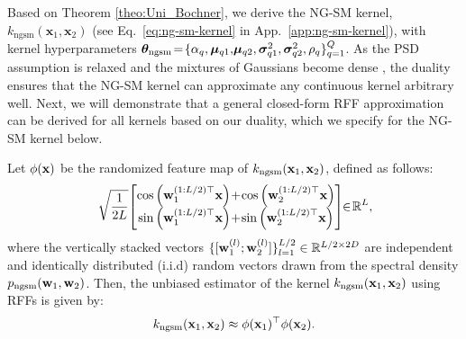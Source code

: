 {\color{black}Based on Theorem \ref{theo:Uni_Bochner}, we derive the NG-SM kernel, \(k_{\text{ngsm}}(\mathbf{x}_1, \mathbf{x}_2)\) (see Eq.~\eqref{eq:ng-sm-kernel} in App.~\ref{app:ng-sm-kernel}), with kernel hyperparameters  $\boldsymbol{\theta}_{\mathrm{ngsm}} \!=\! \{\alpha_q, \boldsymbol{\mu}_{q1},\!{\color{black}\boldsymbol{\mu}_{q2}}, \boldsymbol{\sigma}_{q1}^2, \boldsymbol{\sigma}_{q2}^2, \rho_q\}_{q=1}^Q$.} As the PSD assumption is relaxed and the mixtures of Gaussians become dense \citep{plataniotis2017gaussian}, the duality ensures that the NG-SM kernel can approximate any continuous kernel arbitrary well. Next, we will demonstrate that a general closed-form RFF approximation can be derived for all kernels based on our duality, which we specify for the NG-SM kernel below. 

\begin{theorem}
\label{theo:Non_stationary RFF}
Let $\phi({\mathbf x})$ be the randomized feature map of $k_{\text{ngsm}}({\mathbf x}_1, {\mathbf x}_2)$, defined as follows:
\begin{equation}
    \!\sqrt{\frac{1}{2L}}\!\begin{bmatrix}
    \cos \left( \mathbf{w}_{1}^{(1:L/2) \top}  \x \right)\!+\!\cos \left(  \mathbf{w}_{2}^{(1:L/2)\top} \x \right) \\
    \sin \left( \mathbf{w}_{1}^{(1:L/2)\top}\x  \right)\!+\!\sin \left(  \mathbf{w}_{2}^{(1:L/2)\top} \x \right)  
    \end{bmatrix}\!\!\in\!\mathbb{R}^{L},\!\!
    \label{eq:rff_def}
\end{equation}
where the vertically stacked vectors $\{ [\mathbf{w}_1^{(l)}; {\mathbf w}_2^{(l)} ]\}_{l=1}^{L/2} \in \mathbb{R}^{L/2 \times 2D}$ are independent and identically distributed (i.i.d) random vectors drawn from the spectral density $p_{\text{ngsm}}({\mathbf w}_1, {\mathbf w}_2)$. Then, the unbiased estimator of the kernel $k_{\text{ngsm}}({\mathbf x}_1,{\mathbf x}_2)$ using RFFs is given by:
\begin{equation}
k_{\text{ngsm}}({\mathbf x}_1, {\mathbf x}_2) \approx \phi({\mathbf x}_1)^\top \phi({\mathbf x}_2).   \label{eq:kernel_app}
\end{equation} 
\end{theorem}
